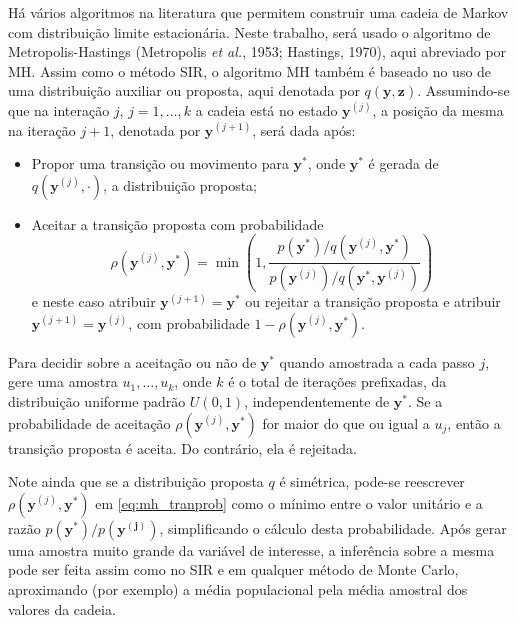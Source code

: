Há vários algoritmos na literatura que permitem construir uma cadeia de Markov com distribuição limite estacionária. Neste trabalho, será usado o algoritmo de Metropolis-Hastings (Metropolis \textit{et al.}, 1953\cite{Metrop1953}; Hastings, 1970\cite{Hastin1970}), aqui abreviado por MH. Assim como o método SIR, o algoritmo MH também é baseado no uso de uma distribuição auxiliar ou proposta, aqui denotada por $q(\bm{y}, \bm{z})$. Assumindo-se que na interação $j$, $j = 1, \ldots, k$ a cadeia está no estado $\bm{y}^{(j)}$, a posição da mesma na iteração $j + 1$, denotada por $\bm{y}^{(j + 1)}$, será dada após:
\begin{itemize}
	\item Propor uma transição ou movimento para $\bm{y}^*$, onde $\bm{y}^*$ é gerada de $q(\bm{y}^{(j)}, \cdot)$, a distribuição proposta;
	\item Aceitar a transição proposta com probabilidade
	\begin{equation}\label{eq:mh_tranprob}
	\rho(\bm{y}^{(j)}, \bm{y}^*) = \min\left(1, \dfrac{p(\bm{y}^*) / q(\bm{y}^{(j)}, \bm{y}^*)}{p(\bm{y}^{(j)}) / q(\bm{y}^*, \bm{y}^{(j)})}\right)
	\end{equation}
	e neste caso atribuir $\bm{y}^{(j + 1)} = \bm{y}^*$ ou rejeitar a transição proposta e atribuir $\bm{y}^{(j + 1)} = \bm{y}^{(j)}$, com probabilidade $1 - \rho(\bm{y}^{(j)}, \bm{y}^*)$.
\end{itemize}

Para decidir sobre a aceitação ou não de $\bm{y}^*$ quando amostrada a cada passo $j$, gere uma amostra $u_1, \ldots, u_k$, onde $k$ é o total de iterações prefixadas, da distribuição uniforme padrão $U(0,1)$, independentemente de $\bm{y}^*$. Se a probabilidade de aceitação $\rho(\bm{y}^{(j)}, \bm{y}^*)$ for maior do que ou igual a $u_j$, então a transição proposta é aceita. Do contrário, ela é rejeitada.

Note ainda que se a distribuição proposta $q$ é simétrica, pode-se reescrever $\rho(\bm{y}^{(j)}, \bm{y}^*)$ em \eqref{eq:mh_tranprob} como o mínimo entre o valor unitário e a razão $p(\bm{y}^*)/p(\bm{y^{(j)}})$, simplificando o cálculo desta probabilidade. Após gerar uma amostra muito grande da variável de interesse, a inferência sobre a mesma pode ser feita assim como no SIR e em qualquer método de Monte Carlo, aproximando (por exemplo) a média populacional pela média amostral dos valores da cadeia.

